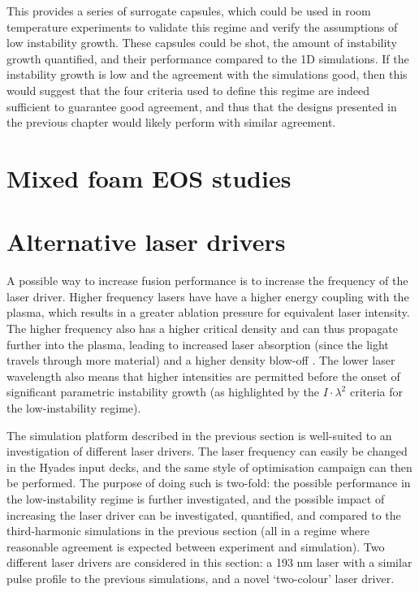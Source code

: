This provides a series of surrogate capsules, which could be used in room temperature experiments to validate this regime and verify the assumptions of low instability growth. These capsules could be shot, the amount of instability growth quantified, and their performance compared to the 1D simulations. If the instability growth is low and the agreement with the simulations good, then this would suggest that the four criteria used to define this regime are indeed sufficient to guarantee good agreement, and thus that the designs presented in the previous chapter would likely perform with similar agreement. 

\section{Mixed foam EOS studies}






\section{Alternative laser drivers}

A possible way to increase fusion performance is to increase the frequency of the laser driver. Higher frequency lasers have have a higher energy coupling with the plasma, which results in a greater ablation pressure for equivalent laser intensity. The higher frequency also has a higher critical density and can thus propagate further into the plasma, leading to increased laser absorption (since the light travels through more material) and a higher density blow-off \cite{Obenschain2020}. The lower laser wavelength also means that higher intensities are permitted before the onset of significant parametric instability growth \cite{Montgomery2016} (as highlighted by the $I \cdot \lambda^2$ criteria for the low-instability regime). 

The simulation platform described in the previous section is well-suited to an investigation of different laser drivers. The laser frequency can easily be changed in the Hyades input decks, and the same style of optimisation campaign can then be performed. The purpose of doing such is two-fold: the possible performance in the low-instability regime is further investigated, and the possible impact of increasing the laser driver can be investigated, quantified, and compared to the third-harmonic simulations in the previous section (all in a regime where reasonable agreement is expected between experiment and simulation). Two different laser drivers are considered in this section: a 193 \unit{\nano\meter} laser with a similar pulse profile to the previous simulations, and a novel `two-colour' laser driver.

